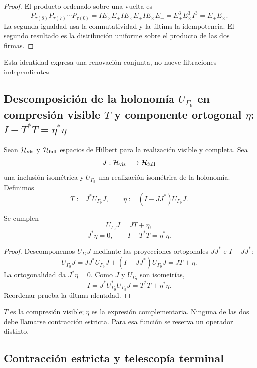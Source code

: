 \begin{proof}
El producto ordenado sobre una vuelta es
\[
 P_{\tau(8)}P_{\tau(7)}\cdots P_{\tau(0)}
 =I E_\times E_+ I E_\times E_+ I E_\times E_+
 =E_+^3E_\times^3I^3=E_+E_\times.
\]
La segunda igualdad usa la conmutatividad y la última la idempotencia.
El segundo resultado es la distribución uniforme sobre el producto de las
dos firmas.
\end{proof}

Esta identidad expresa una renovación conjunta, no nueve filtraciones
independientes.

\subsection{Descomposición de la holonomía \(U_{\Gamma_9}\) en compresión visible \(T\) y componente ortogonal \(\eta\): \(I-T^*T=\eta^*\eta\)}

Sean \(\mathcal H_{\rm vis}\) y \(\mathcal H_{\rm full}\) espacios de
Hilbert para la realización visible y completa. Sea
\[
 J:\mathcal H_{\rm vis}\longrightarrow\mathcal H_{\rm full}
\]
una inclusión isométrica y
\(U_{\Gamma_9}\) una realización isométrica de la holonomía. Definimos
\[
 T:=J^*U_{\Gamma_9}J,
 \qquad
 \eta:=(I-JJ^*)U_{\Gamma_9}J.
\]

\begin{theorem}
\label{p12-83-c7-s1:thm:conexion-compresion-expresion}
Se cumplen
\[
 \boxed{U_{\Gamma_9}J=JT+\eta,}
\]
\[
 J^*\eta=0,
 \qquad
 \boxed{I-T^*T=\eta^*\eta.}
\]
\end{theorem}

\begin{proof}
Descomponemos \(U_{\Gamma_9}J\) mediante las proyecciones ortogonales
\(JJ^*\) e \(I-JJ^*\):
\[
 U_{\Gamma_9}J
 =JJ^*U_{\Gamma_9}J+(I-JJ^*)U_{\Gamma_9}J
 =JT+\eta.
\]
La ortogonalidad da \(J^*\eta=0\). Como \(J\) y
\(U_{\Gamma_9}\) son isometrías,
\[
 I=J^*U_{\Gamma_9}^*U_{\Gamma_9}J
 =T^*T+\eta^*\eta.
\]
Reordenar prueba la última identidad.
\end{proof}

\(T\) es la compresión visible; \(\eta\) es la expresión complementaria.
Ninguna de las dos debe llamarse contracción estricta. Para esa función se
reserva un operador distinto.

\subsection{Contracción estricta y telescopía terminal}

